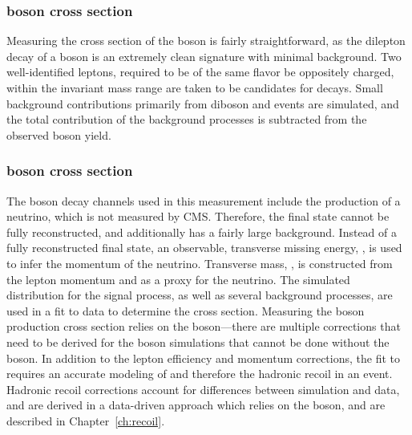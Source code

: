 \subsubsection{\Z boson cross section}
Measuring the cross section of the \Z boson is fairly straightforward, as the dilepton decay of a \Z boson is an extremely clean signature with minimal background. Two well-identified leptons, required to be of the same flavor be oppositely charged, within the invariant mass range \masswindow are taken to be candidates for \zll decays. Small background contributions primarily from diboson and \ttbar events are simulated, and the total contribution of the background processes is subtracted from the observed \Z boson yield. 

\subsubsection{\W boson cross section}
The \W boson decay channels used in this measurement include the production of a neutrino, which is not measured by CMS. Therefore, the final state cannot be fully reconstructed, and additionally has a fairly large background. Instead of a fully reconstructed final state, an observable, transverse missing energy, \met, is used to infer the momentum of the neutrino. Transverse mass, \mt, is constructed from the lepton momentum and \met as a proxy for the neutrino. The simulated \mt distribution for the \wlnu signal process, as well as several background processes, are used in a fit to data to determine the cross section. 
Measuring the \W boson production cross section relies on the \Z boson---there are multiple corrections that need to be derived for the \W boson simulations that cannot be done without the \Z boson. In addition to the lepton efficiency and momentum corrections, the fit to \mt requires an accurate modeling of \met and therefore the hadronic recoil in an event. Hadronic recoil corrections account for differences between simulation and data, and are derived in a data-driven approach which relies on the \Z boson, and are described in Chapter~\ref{ch:recoil}. 


